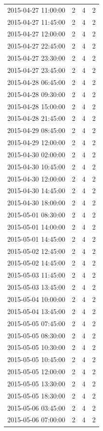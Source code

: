 \begin{tabular}{lrrr}
2015-04-27 11:00:00 & 2 & 4 & 2 \\
2015-04-27 11:45:00 & 2 & 4 & 2 \\
2015-04-27 12:00:00 & 2 & 4 & 2 \\
2015-04-27 22:45:00 & 2 & 4 & 2 \\
2015-04-27 23:30:00 & 2 & 4 & 2 \\
2015-04-27 23:45:00 & 2 & 4 & 2 \\
2015-04-28 06:45:00 & 2 & 4 & 2 \\
2015-04-28 09:30:00 & 2 & 4 & 2 \\
2015-04-28 15:00:00 & 2 & 4 & 2 \\
2015-04-28 21:45:00 & 2 & 4 & 2 \\
2015-04-29 08:45:00 & 2 & 4 & 2 \\
2015-04-29 12:00:00 & 2 & 4 & 2 \\
2015-04-30 02:00:00 & 2 & 4 & 2 \\
2015-04-30 10:45:00 & 2 & 4 & 2 \\
2015-04-30 12:00:00 & 2 & 4 & 2 \\
2015-04-30 14:45:00 & 2 & 4 & 2 \\
2015-04-30 18:00:00 & 2 & 4 & 2 \\
2015-05-01 08:30:00 & 2 & 4 & 2 \\
2015-05-01 14:00:00 & 2 & 4 & 2 \\
2015-05-01 14:45:00 & 2 & 4 & 2 \\
2015-05-02 12:45:00 & 2 & 4 & 2 \\
2015-05-02 14:45:00 & 2 & 4 & 2 \\
2015-05-03 11:45:00 & 2 & 4 & 2 \\
2015-05-03 13:45:00 & 2 & 4 & 2 \\
2015-05-04 10:00:00 & 2 & 4 & 2 \\
2015-05-04 13:45:00 & 2 & 4 & 2 \\
2015-05-05 07:45:00 & 2 & 4 & 2 \\
2015-05-05 08:30:00 & 2 & 4 & 2 \\
2015-05-05 10:30:00 & 2 & 4 & 2 \\
2015-05-05 10:45:00 & 2 & 4 & 2 \\
2015-05-05 12:00:00 & 2 & 4 & 2 \\
2015-05-05 13:30:00 & 2 & 4 & 2 \\
2015-05-05 18:30:00 & 2 & 4 & 2 \\
2015-05-06 03:45:00 & 2 & 4 & 2 \\
2015-05-06 07:00:00 & 2 & 4 & 2 \\

\end{tabular}
